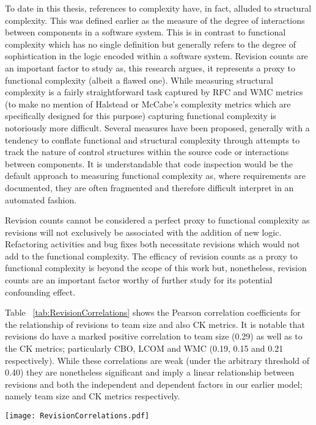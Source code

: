 To date in this thesis, references to complexity have, in fact, alluded to structural complexity. This was defined earlier as the measure of the degree of interactions between components in a software system. This is in contrast to functional complexity which has no single definition but generally refers to the degree of sophistication in the logic encoded within a software system. Revision counts are an important factor to study as, this research argues, it represents a proxy to functional complexity (albeit a flawed one). While measuring structural complexity is a fairly straightforward task captured by RFC and WMC metrics (to make no mention of Halstead or McCabe's complexity metrics which are specifically designed for this purpose) capturing functional complexity is notoriously more difficult. Several measures have been proposed, generally with a tendency to conflate functional and structural complexity through attempts to track the nature of control structures within the source code or interactions between components. It is understandable that code inspection would be the default approach to measuring functional complexity as, where requirements are documented, they are often fragmented and therefore difficult interpret in an automated fashion. 

Revision counts cannot be considered a perfect proxy to functional complexity as revisions will not exclusively be associated with the addition of new logic. Refactoring activities and bug fixes both necessitate revisions which would not add to the functional complexity. The efficacy of revision counts as a proxy to functional complexity is beyond the scope of this work but, nonetheless, revision counts are an important factor worthy of further study for its potential confounding effect.

Table ~\ref{tab:RevisionCorrelations} shows the Pearson correlation coefficients for the relationship of revisions to team size and also CK metrics. It is notable that revisions do have a marked positive correlation to team size (0.29) as well as to the CK metrics; particularly CBO, LCOM and WMC (0.19, 0.15 and 0.21 respectively). While these correlations are weak (under the arbitrary threshold of 0.40) they are nonetheless significant and imply a linear relationship between revisions and both the independent and dependent factors in our earlier model; namely team size and CK metrics respectively.

\begin{table}
\centering 
{}
\begin{tabular}
 \centering 
 \texttt{[image: RevisionCorrelations.pdf]}
 \label{tab:RevisionCorrelations}
\end{tabular}
\end{table}

